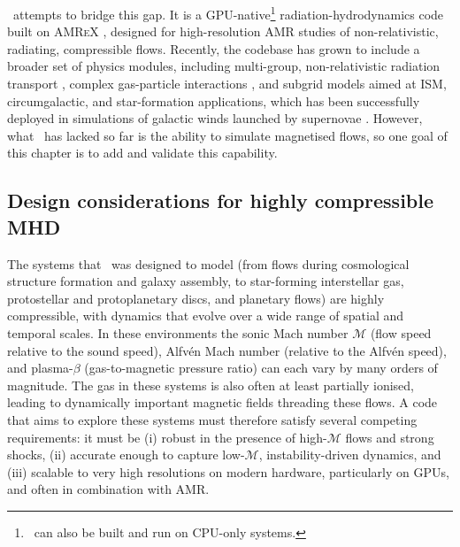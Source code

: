 \quokka~attempts to bridge this gap. It is a GPU-native\footnote{
    \quokka~can also be built and run on CPU-only systems.
} radiation-hydrodynamics code built on \textsc{AMReX} \citep{Zhang19b}, designed for high-resolution AMR studies of non-relativistic, radiating, compressible flows. Recently, the codebase has grown to include a broader set of physics modules, including multi-group, non-relativistic radiation transport \citep{He24a, He24b}, complex gas-particle interactions \citep{He25a}, and subgrid models aimed at ISM, circumgalactic, and star-formation applications, which has been successfully deployed in simulations of galactic winds launched by supernovae \citep{Vijayan24a, Vijayan25a, huang2026quokka}. However, what \quokka~has lacked so far is the ability to simulate magnetised flows, so one goal of this chapter is to add and validate this capability.

\subsection{Design considerations for highly compressible MHD}
\label{sec:intro:goals}

The systems that \quokka~was designed to model (from flows during cosmological structure formation and galaxy assembly, to star-forming interstellar gas, protostellar and protoplanetary discs, and planetary flows) are highly compressible, with dynamics that evolve over a wide range of spatial and temporal scales. In these environments the sonic Mach number $\mathcal{M}$ (flow speed relative to the sound speed), Alfv\'en Mach number (relative to the Alfv\'en speed), and plasma-$\beta$ (gas-to-magnetic pressure ratio) can each vary by many orders of magnitude. The gas in these systems is also often at least partially ionised, leading to dynamically important magnetic fields threading these flows. A code that aims to explore these systems must therefore satisfy several competing requirements: it must be (i) robust in the presence of high-$\mathcal{M}$ flows and strong shocks, (ii) accurate enough to capture low-$\mathcal{M}$, instability-driven dynamics, and (iii) scalable to very high resolutions on modern hardware, particularly on GPUs, and often in combination with AMR.

